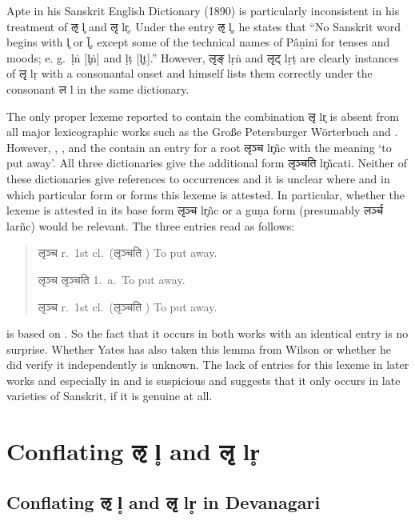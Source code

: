 Apte in his Sanskrit English Dictionary (1890) is particularly inconsistent in his treatment of {\devfont ऌ} l̥ and {\devfont लृ} lr̥. Under the entry {\devfont ऌ} l̥, he states that “No Sanskrit word begins with l̥ or l̥̄, except some of the technical names of Pâṇini for tenses and moods; e. g.~ḷṅ [l̥ṅ] and ḷṭ [l̥ṭ].” However, {\devfont लृङ्} lṛṅ  and {\devfont लृट्} lṛṭ are clearly instances of {\devfont लृ} lṛ with a consonantal onset and \citet{ap90} himself lists them correctly under the consonant {\devfont ल} l in the same dictionary.

The only proper lexeme reported to contain the combination {\devfont लृ} lr̥ is absent from all major lexicographic works such as the Große Petersburger Wörterbuch \citep{pwg} and \citet{mw72,mw}.  However, \citet{wil}, \citet{yat}, and the \citet{shs} contain an entry for a root {\devfont लृञ्च} lr̥ñc with the meaning ‘to put away’. All three dictionaries give the additional form {\devfont लृञ्चति}  lr̥ñcati. Neither of these dictionaries give references to occurrences and it is unclear where and in which particular form or forms this lexeme is attested. In particular, whether the lexeme is attested in its base form {\devfont लृञ्च} lr̥ñc or a guṇa form (presumably {\devfont लर्ञ्च} larñc) would be relevant. The three entries read as follows:

\begin{quote}
{\devbfont लृञ्च} r.~1st cl.~({\devfont लृञ्चति} ) To put away. \citep[][p.~722]{wil}

{\devbfont लृञ्च} {\devfont लृञ्चति}  1.~a.~To put away. \citep[][p.~646]{yat}

{\devbfont लृञ्च} r.~1st cl.~({\devfont लृञ्चति} ) To put away. \citep[][p.~619]{shs}
\end{quote}

\citet{shs} is based on \citet{wil}. So the fact that it occurs in both works with an identical entry is no surprise. Whether Yates has also taken this lemma from Wilson or whether he did verify it independently is unknown. The lack of entries for this lexeme in later works and especially in \citet{pwg} and \citet{mw} is suspicious and suggests that it only occurs in late varieties of Sanskrit, if it is genuine at all.

\section{Conflating {\devhmfont ऌ} l̥ and {\devhmfont लृ} lr̥}
\subsection{Conflating {\devhmfont ऌ} l̥ and {\devhmfont लृ} lr̥ in Devanagari} 

